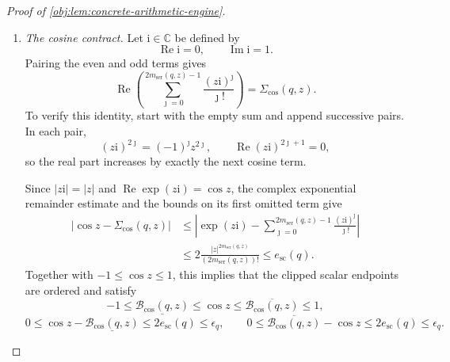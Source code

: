 \documentclass[11pt]{article}
\begin{document}
\begin{proof}[Proof of \cref{obj:lem:concrete-arithmetic-engine}]
\begin{enumerate}
Now let
\[
-3\le a_{\mathrm{in}}\le b_{\mathrm{in}}\le3.
\]
Both endpoint exponents satisfy the scalar hypotheses. Because
\(v_{\mathrm{pow}}\mapsto b^{v_{\mathrm{pow}}}\) is monotone,
\[
\underline{\mathcal B_{\mathrm{pow}}(q,b,a_{\mathrm{in}})}
 \le b^{a_{\mathrm{in}}}
 \le b^{b_{\mathrm{in}}}
 \le\overline{\mathcal B_{\mathrm{pow}}(q,b,b_{\mathrm{in}})}.
\]
For every \(x_{\mathrm{arg}}\in I_{\mathrm{arg}}\),
\[
\underline{\mathcal B_{\mathrm{pow}}(q,b,a_{\mathrm{in}})}
 \le b^{x_{\mathrm{arg}}}
 \le\overline{\mathcal B_{\mathrm{pow}}(q,b,b_{\mathrm{in}})}.
\]
The endpoint extension inherits the two scalar excess bounds and the positive lower endpoint. This includes \(b=1\), the exponent endpoints \(-3,3\), and degenerate intervals.

\item \emph{The cosine contract.}
Let \(\mathrm i\in\mathbb C\) be defined by
\[
\operatorname{Re}\mathrm i=0,\qquad
\operatorname{Im}\mathrm i=1.
\]
Pairing the even and odd terms gives
\[
\operatorname{Re}\left(
 \sum_{\jmath=0}^{2m_{\mathrm{ser}}(q,z)-1}
       \frac{(z\mathrm i)^\jmath}{\jmath!}\right)
 =\Sigma_{\cos}(q,z).
\]
To verify this identity, start with the empty sum and append successive pairs. In each pair,
\[
(z\mathrm i)^{2\jmath}=(-1)^\jmath z^{2\jmath},
\qquad
\operatorname{Re}(z\mathrm i)^{2\jmath+1}=0,
\]
so the real part increases by exactly the next cosine term.

Since \(|z\mathrm i|=|z|\) and
\(\operatorname{Re}\exp(z\mathrm i)=\cos z\), the complex exponential remainder estimate and the bounds on its first omitted term give
\[
\begin{split}
|\cos z-\Sigma_{\cos}(q,z)|
&\le
 \left|\exp(z\mathrm i)
  -\sum_{\jmath=0}^{2m_{\mathrm{ser}}(q,z)-1}
       \frac{(z\mathrm i)^\jmath}{\jmath!}\right|\\
&\le2\frac{|z|^{2m_{\mathrm{ser}}(q,z)}}
               {(2m_{\mathrm{ser}}(q,z))!}
 \le e_{\mathrm{sc}}(q).
\end{split}
\]
Together with \(-1\le\cos z\le1\), this implies that the clipped scalar endpoints are ordered and satisfy
\[
-1\le\underline{\mathcal B_{\cos}(q,z)}
 \le\cos z\le\overline{\mathcal B_{\cos}(q,z)}\le1,
\]
\[
0\le\cos z-\underline{\mathcal B_{\cos}(q,z)}
 \le2e_{\mathrm{sc}}(q)\le\epsilon_q,
\qquad
0\le\overline{\mathcal B_{\cos}(q,z)}-\cos z
 \le2e_{\mathrm{sc}}(q)\le\epsilon_q.
\]


\end{enumerate}
\end{proof}
\end{document}
